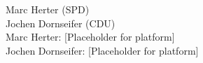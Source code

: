 \documentclass[preview]{standalone}
\begin{document}
Marc Herter (SPD)\\Jochen Dornseifer (CDU)\\Marc Herter: [Placeholder for platform]\\Jochen Dornseifer: [Placeholder for platform]\\
\end{document}
